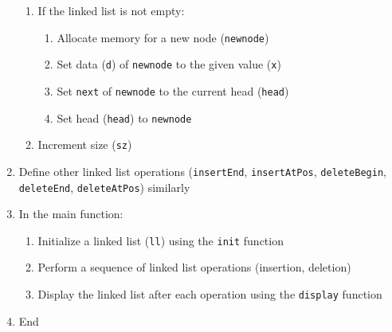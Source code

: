 \documentclass{article}
\begin{document}
\begin{enumerate}
\begin{enumerate}
      \item If the linked list is not empty:
        \begin{enumerate}
          \item Allocate memory for a new node (\texttt{newnode})
          \item Set data (\texttt{d}) of \texttt{newnode} to the given value (\texttt{x})
          \item Set \texttt{next} of \texttt{newnode} to the current head (\texttt{head})
          \item Set head (\texttt{head}) to \texttt{newnode}
        \end{enumerate}
      \item Increment size (\texttt{sz})
    \end{enumerate}
  \item Define other linked list operations (\texttt{insertEnd}, \texttt{insertAtPos}, \texttt{deleteBegin}, \texttt{deleteEnd}, \texttt{deleteAtPos}) similarly
  \item In the main function:
    \begin{enumerate}
      \item Initialize a linked list (\texttt{ll}) using the \texttt{init} function
      \item Perform a sequence of linked list operations (insertion, deletion)
      \item Display the linked list after each operation using the \texttt{display} function
    \end{enumerate}
  \item End
\end{enumerate}
\end{document}
